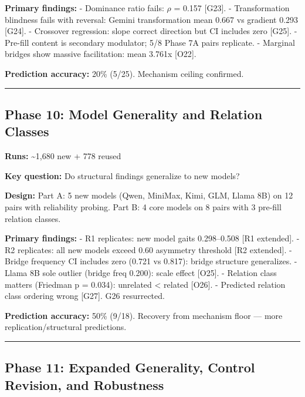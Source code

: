 \textbf{Primary findings:} - Dominance ratio fails: \(\rho\) = 0.157 {[}G23{]}. - Transformation blindness fails with reversal: Gemini transformation mean 0.667 vs gradient 0.293 {[}G24{]}. - Crossover regression: slope correct direction but CI includes zero {[}G25{]}. - Pre-fill content is secondary modulator; 5/8 Phase 7A pairs replicate. - Marginal bridges show massive facilitation: mean 3.761x {[}O22{]}.

\textbf{Prediction accuracy:} 20\% (5/25). Mechanism ceiling confirmed.

\begin{center}\rule{0.5\linewidth}{0.5pt}\end{center}

\subsection{Phase 10: Model Generality and Relation Classes}\label{phase-10-model-generality-and-relation-classes}

\textbf{Runs:} \textasciitilde1,680 new + 778 reused

\textbf{Key question:} Do structural findings generalize to new models?

\textbf{Design:} Part A: 5 new models (Qwen, MiniMax, Kimi, GLM, Llama 8B) on 12 pairs with reliability probing. Part B: 4 core models on 8 pairs with 3 pre-fill relation classes.

\textbf{Primary findings:} - R1 replicates: new model gaits 0.298--0.508 {[}R1 extended{]}. - R2 replicates: all new models exceed 0.60 asymmetry threshold {[}R2 extended{]}. - Bridge frequency CI includes zero (0.721 vs 0.817): bridge structure generalizes. - Llama 8B sole outlier (bridge freq 0.200): scale effect {[}O25{]}. - Relation class matters (Friedman p = 0.034): unrelated \textless{} related {[}O26{]}. - Predicted relation class ordering wrong {[}G27{]}. G26 resurrected.

\textbf{Prediction accuracy:} 50\% (9/18). Recovery from mechanism floor --- more replication/structural predictions.

\begin{center}\rule{0.5\linewidth}{0.5pt}\end{center}

\subsection{Phase 11: Expanded Generality, Control Revision, and Robustness}\label{phase-11-expanded-generality-control-revision-and-robustness}

